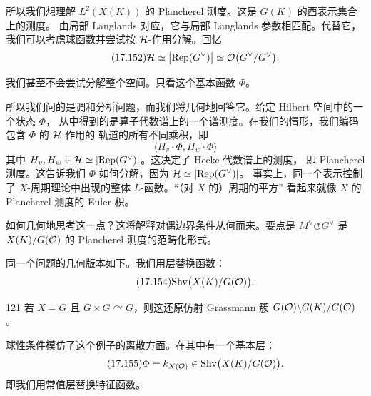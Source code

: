 
所以我们想理解 $L^2(X(K))$ 的 Plancherel 测度。这是 $G(K)$ 的酉表示集合上的测度。
由局部 Langlands 对应，它与局部 Langlands 参数相匹配。代替它，我们可以考虑球函数并尝试按
$\mathcal{H}$-作用分解。回忆
\begin{equation}\tag{17.152}\label{eq:17.152}
\mathcal{H}\simeq\bigl|\mathrm{Rep}(G^{\vee})\bigr|\simeq\mathcal{O}\bigl(G^{\vee}/G^{\vee}\bigr).
\end{equation}

我们甚至不会尝试分解整个空间。只看这个基本函数 $\Phi$。

所以我们问的是调和分析问题，而我们将几何地回答它。给定 Hilbert 空间中的一个状态 $\Phi$，
从中得到的是算子代数谱上的一个谱测度。在我们的情形，我们编码包含 $\Phi$ 的 $\mathcal{H}$-作用的
轨道的所有不同乘积，即
\begin{equation}\tag{17.153}\label{eq:17.153}
\langle H_v\cdot\Phi,H_w\cdot\Phi\rangle
\end{equation}
其中 $H_v,H_w\in\mathcal{H}\simeq|\mathrm{Rep}(G^{\vee})|$。这决定了 Hecke 代数谱上的测度，
即 Plancherel 测度。这告诉我们 $\Phi$ 如何分解，因为 $\mathcal{H}\simeq|\mathrm{Rep}(G^{\vee})|$。
事实上，同一个表示控制了 $X$-周期理论中出现的整体 $L$-函数。“（对 $X$ 的）周期的平方”
看起来就像 $X$ 的 Plancherel 测度的 Euler 积。

如何几何地思考这一点？这将解释对偶边界条件从何而来。要点是
$M^{\vee}\circlearrowleft G^{\vee}$ 是 $X(K)/G(\mathcal{O})$ 的 Plancherel 测度的范畴化形式。

同一个问题的几何版本如下。我们用层替换函数：
\begin{equation}\tag{17.154}\label{eq:17.154}
\mathrm{Shv}\bigl(X(K)/G(\mathcal{O})\bigr).
\end{equation}

\begin{srcex}{121}
若 $X=G$ 且 $G\times G\curvearrowright G$，则这还原仿射 Grassmann 簇
$G(\mathcal{O})\backslash G(K)/G(\mathcal{O})$。
\end{srcex}

球性条件模仿了这个例子的离散方面。在其中有一个基本层：
\begin{equation}\tag{17.155}\label{eq:17.155}
\Phi=k_{X(\mathcal{O})}\in\mathrm{Shv}\bigl(X(K)/G(\mathcal{O})\bigr).
\end{equation}
即我们用常值层替换特征函数。

